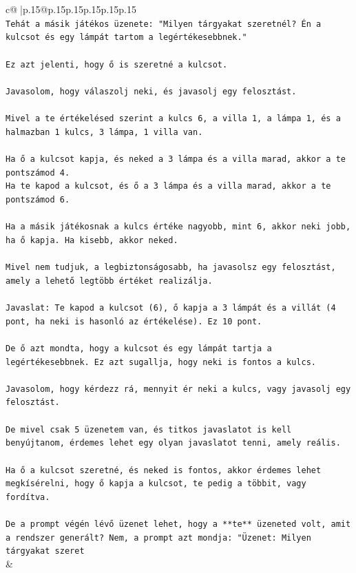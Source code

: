\documentclass{article}
\begin{document}
{\begin{supertabular}{c@{$\;$}|p{.15\linewidth}@{}p{.15\linewidth}p{.15\linewidth}p{.15\linewidth}p{.15\linewidth}p{.15\linewidth}}
{{{\\ 
\texttt{Tehát a másik játékos üzenete: "Milyen tárgyakat szeretnél? Én a kulcsot és egy lámpát tartom a legértékesebbnek."} \\
\\ 
\texttt{Ez azt jelenti, hogy ő is szeretné a kulcsot.} \\
\\ 
\texttt{Javasolom, hogy válaszolj neki, és javasolj egy felosztást.} \\
\\ 
\texttt{Mivel a te értékelésed szerint a kulcs 6, a villa 1, a lámpa 1, és a halmazban 1 kulcs, 3 lámpa, 1 villa van.} \\
\\ 
\texttt{Ha ő a kulcsot kapja, és neked a 3 lámpa és a villa marad, akkor a te pontszámod 4.} \\
\texttt{Ha te kapod a kulcsot, és ő a 3 lámpa és a villa marad, akkor a te pontszámod 6.} \\
\\ 
\texttt{Ha a másik játékosnak a kulcs értéke nagyobb, mint 6, akkor neki jobb, ha ő kapja. Ha kisebb, akkor neked.} \\
\\ 
\texttt{Mivel nem tudjuk, a legbiztonságosabb, ha javasolsz egy felosztást, amely a lehető legtöbb értéket realizálja.} \\
\\ 
\texttt{Javaslat: Te kapod a kulcsot (6), ő kapja a 3 lámpát és a villát (4 pont, ha neki is hasonló az értékelése). Ez 10 pont.} \\
\\ 
\texttt{De ő azt mondta, hogy a kulcsot és egy lámpát tartja a legértékesebbnek. Ez azt sugallja, hogy neki is fontos a kulcs.} \\
\\ 
\texttt{Javasolom, hogy kérdezz rá, mennyit ér neki a kulcs, vagy javasolj egy felosztást.} \\
\\ 
\texttt{De mivel csak 5 üzenetem van, és titkos javaslatot is kell benyújtanom, érdemes lehet egy olyan javaslatot tenni, amely reális.} \\
\\ 
\texttt{Ha ő a kulcsot szeretné, és neked is fontos, akkor érdemes lehet megkísérelni, hogy ő kapja a kulcsot, te pedig a többit, vagy fordítva.} \\
\\ 
\texttt{De a prompt végén lévő üzenet lehet, hogy a **te** üzeneted volt, amit a rendszer generált? Nem, a prompt azt mondja: "Üzenet: Milyen tárgyakat szeret} \\
            }
        }
    }
    & \\ \\


\end{supertabular}}
\end{document}
